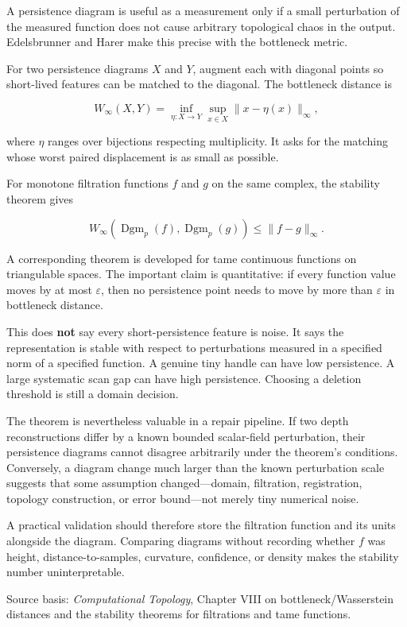 A persistence diagram is useful as a measurement only if a small perturbation of the measured function does not cause arbitrary topological chaos in the output. Edelsbrunner and Harer make this precise with the bottleneck metric.

For two persistence diagrams \(X\) and \(Y\), augment each with diagonal points so short-lived features can be matched to the diagonal. The bottleneck distance is

\[
W_\infty(X,Y)
=
\inf_{\eta:X\to Y}
\sup_{x\in X}
\|x-\eta(x)\|_\infty,
\]

where \(\eta\) ranges over bijections respecting multiplicity. It asks for the matching whose worst paired displacement is as small as possible.

For monotone filtration functions \(f\) and \(g\) on the same complex, the stability theorem gives

\[
W_\infty(
\operatorname{Dgm}_p(f),
\operatorname{Dgm}_p(g)
)
\le
\|f-g\|_\infty.
\]

A corresponding theorem is developed for tame continuous functions on triangulable spaces. The important claim is quantitative: if every function value moves by at most \(\varepsilon\), then no persistence point needs to move by more than \(\varepsilon\) in bottleneck distance.

This does \textbf{not} say every short-persistence feature is noise. It says the representation is stable with respect to perturbations measured in a specified norm of a specified function. A genuine tiny handle can have low persistence. A large systematic scan gap can have high persistence. Choosing a deletion threshold is still a domain decision.

The theorem is nevertheless valuable in a repair pipeline. If two depth reconstructions differ by a known bounded scalar-field perturbation, their persistence diagrams cannot disagree arbitrarily under the theorem's conditions. Conversely, a diagram change much larger than the known perturbation scale suggests that some assumption changed---domain, filtration, registration, topology construction, or error bound---not merely tiny numerical noise.

A practical validation should therefore store the filtration function and its units alongside the diagram. Comparing diagrams without recording whether \(f\) was height, distance-to-samples, curvature, confidence, or density makes the stability number uninterpretable.

Source basis: \emph{Computational Topology}, Chapter VIII on bottleneck/Wasserstein distances and the stability theorems for filtrations and tame functions.

